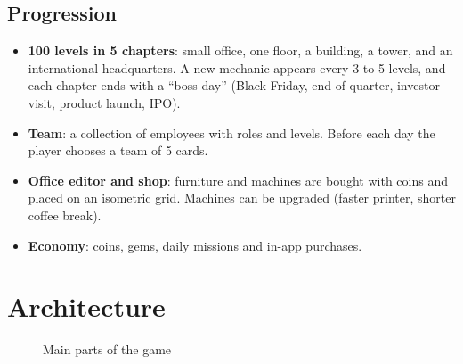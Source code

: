 \documentclass[a4paper,11pt]{article}
\newcommand{\code}[1]{\texttt{#1}}
\begin{document}
\subsection{Progression}
\begin{itemize}
  \item \textbf{100 levels in 5 chapters}: small office, one floor, a building, a tower, and an international headquarters. A new mechanic appears every 3 to 5 levels, and each chapter ends with a ``boss day'' (Black Friday, end of quarter, investor visit, product launch, IPO).
  \item \textbf{Team}: a collection of employees with roles and levels. Before each day the player chooses a team of 5 cards.
  \item \textbf{Office editor and shop}: furniture and machines are bought with coins and placed on an isometric grid. Machines can be upgraded (faster printer, shorter coffee break).
  \item \textbf{Economy}: coins, gems, daily missions and in-app purchases.
\end{itemize}

\section{Architecture}

\begin{figure}[H]
\centering
{}
\caption{Main parts of the game}
\end{figure}
\end{document}
